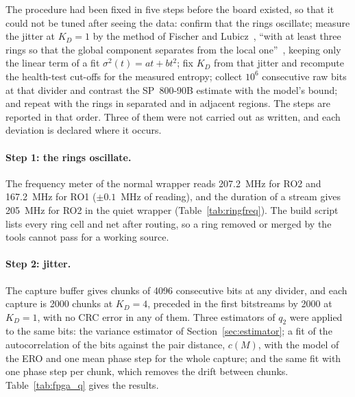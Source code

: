 The procedure had been fixed in five steps before the board existed, so
that it could not be tuned after seeing the data: confirm that the rings
oscillate; measure the jitter at $K_D = 1$ by the method of Fischer and
Lubicz~\cite{fischer_2014_embedded}, ``with at least three rings so that
the global component separates from the local
one''~\cite{lubicz_2024_jitter}, keeping only the linear term of a
fit $\sigma^2(t) = at + bt^2$; fix $K_D$ from that jitter and recompute
the health-test cut-offs for the measured entropy; collect $10^6$
consecutive raw bits at that divider and contrast the SP~800-90B
estimate with the model's bound; and repeat with the rings in separated
and in adjacent regions. The steps are reported in that order. Three of
them were not carried out as written, and each deviation is declared
where it occurs.

\paragraph{Step 1: the rings oscillate.} The frequency meter of the
normal wrapper reads 207.2~MHz for RO2 and 167.2~MHz for RO1 \meas{}
($\pm0.1$~MHz of reading), and the duration of a stream gives 205~MHz for
RO2 in the quiet wrapper (Table~\ref{tab:ringfreq}). The build script
lists every ring cell and net after routing, so a ring removed or merged
by the tools cannot pass for a working source.

\paragraph{Step 2: jitter.} The capture buffer gives chunks of 4096
consecutive bits at any divider, and each capture is 2000 chunks at
$K_D = 4$, preceded in the first bitstreams by 2000 at $K_D = 1$, with no
CRC error in any of them. Three
estimators of $q_2$ were applied to the same bits: the variance estimator
of Section~\ref{sec:estimator}; a fit of the autocorrelation of the bits
against the pair distance, $c(M)$, with the model of the \ac{ERO} and one
mean phase step for the whole capture; and the same fit with one phase
step per chunk, which removes the drift between chunks.
Table~\ref{tab:fpga_q} gives the results.

